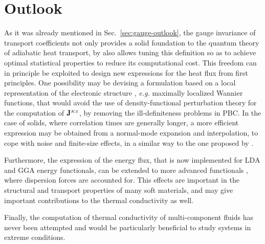 \bigskip
{}


\section{Outlook}  \label{sec:dft-outlook}
\begin{LEtext}
As it was already mentioned in Sec.~\ref{sec:gauge-outlook}, the gauge invariance of transport coefficients not only provides a solid foundation to the quantum theory of adiabatic heat transport, by also allows tuning this definition so as to achieve optimal statistical properties to reduce its computational cost. This freedom can in principle be exploited to design new expressions for the heat flux from first principles. One possibility may be devising a formulation based on a local representation of the electronic structure \cite{Marzari2012,Damle2015}, \emph{e.g.} maximally localized Wannier functions, that would avoid the use of density-functional perturbation theory for the computation of $\mathbf{J}^{{\scriptscriptstyle KS}}$, by removing the ill-definiteness problems in PBC. In the case of solids, where correlation times are generally longer, a more efficient expression may be obtained from a normal-mode expansion \cite{Ladd1986} and interpolation, to cope with noise and finite-size effects, in a similar way to the one proposed by \citet{Carbogno:2017gc}. 

Furthermore, the expression of the energy flux, that is now implemented for LDA and GGA energy functionals, can be extended to more advanced functionals \cite{French_2010:long_range,Berland2015}, where dispersion forces are accounted for. This effects are important in the structural and transport properties of many soft materials, and may give important contributions to the thermal conductivity as well.

Finally, the \abinitio computation of thermal conductivity of multi-component fluids has never been attempted and would be particularly beneficial to study systems in extreme conditions.

\end{LEtext}